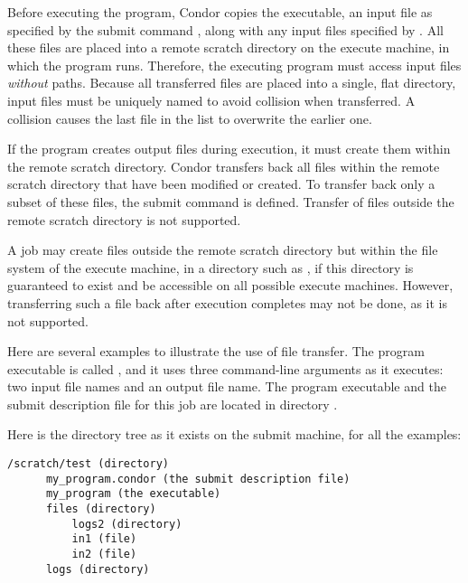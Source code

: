 Before executing the program, Condor copies the
executable, an input file as specified
by the submit command ,
along with any input files specified 
by .
All these files are placed into
a remote scratch directory on the execute machine,
in which the program runs.
Therefore,
the executing program must access input files \emph{without} paths.
Because all transferred files are placed into a single,
flat directory,
input files must be uniquely named to
avoid collision when transferred.
A collision causes the last file in the list to
overwrite the earlier one.

If the program creates output files during execution,
it must create them within the remote scratch directory.
Condor transfers back all files within the remote scratch
directory that have been modified or created.
To transfer back only a subset of these files,
the submit command
is defined.
Transfer of files outside
the remote scratch directory is not supported.

A job may create files outside the remote scratch directory
but within the file system of the execute machine,
in a directory such as ,
if this directory is guaranteed to exist and be
accessible on all possible execute machines.
However,
transferring such a file back after execution completes
may not be done, as it is not supported.

Here are several examples to illustrate the use of file transfer.
The program executable is called ,
and it uses three command-line arguments as it executes: 
two input file names and an output file name.
The program executable and the submit description file 
for this job are located in directory
. 

Here is the directory tree as it exists on the submit machine,
for all the examples:
\begin{verbatim}
/scratch/test (directory)
      my_program.condor (the submit description file)
      my_program (the executable)
      files (directory)
          logs2 (directory)
          in1 (file)
          in2 (file)
      logs (directory)
\end{verbatim}

